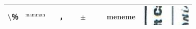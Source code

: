 \documentclass[10pt]{article}
\begin{document}
\begin{center}
\begin{tabular}{|c|c|c|c|c|c|c|c|c|c|}
\hline
\textbackslash ％ & \({ }^{\text {mamman}}\) &  & ， &  & \(\pm\) &  &  & meneme & \includegraphics[max width=\textwidth]{2025_02_27_dd68c3d38de88f0516d9g-096(1)}
 \\
\hline

\end{tabular}
\end{center}
\end{document}
